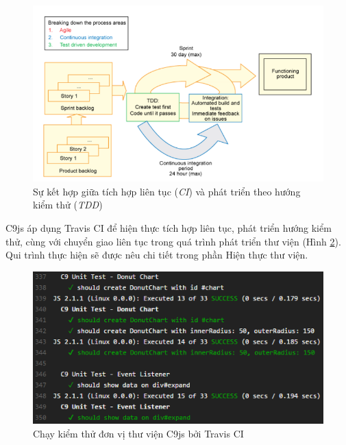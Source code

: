\documentclass[12pt,a4paper,twoside]{article}
\begin{document}
\begin{figure}[!h]
	\begin{center}
    \includegraphics[scale=0.9]{image/ci_cd}
    \caption{Sự kết hợp giữa tích hợp liên tục (\textit{CI}) và phát triển theo hướng kiểm thử (\textit{TDD})}
    \label{fig:ci_cd}
	\end{center}
\end{figure}

C9js áp dụng Travis CI để hiện thực tích hợp liên tục, phát triển hướng kiểm thử, cùng với chuyển giao liên tục trong quá trình phát triển thư viện (Hình \ref{fig:ci_c9}). Qui trình thực hiện sẽ được nêu chi tiết trong phần Hiện thực thư viện.

\begin{figure}[!h]
	\begin{center}
    \includegraphics[scale=1]{image/ci_c9}
    \caption{Chạy kiểm thử đơn vị thư viện C9js bởi Travis CI}
    \label{fig:ci_c9}
	\end{center}
\end{figure}
\clearpage
\end{document}
